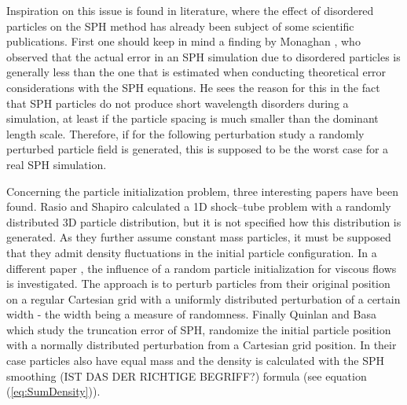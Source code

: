 \documentclass[11pt,a4paper,twoside]{report}
\begin{document}
 Inspiration on this issue is found in literature, where the effect of disordered particles on the SPH method has already been subject of some scientific publications.                                                                                                                      
 First one should keep in mind a finding by Monaghan \cite{Monaghan2005}, who observed that the actual error in an SPH simulation due to disordered particles is generally less than the one that is estimated when conducting theoretical error considerations with the SPH equations. He sees the reason for this in the fact that SPH particles do not produce short wavelength disorders during a simulation, at least if the particle spacing is much smaller than the dominant length scale. Therefore, if for the following perturbation study a randomly perturbed particle field is generated, this is supposed to be the worst case for a real SPH simulation.                                                                  
                                                                                                                                              
 Concerning the particle initialization problem, three interesting papers have been found. Rasio and Shapiro \cite{Rasio1991} calculated a 1D shock--tube problem with a randomly distributed 3D particle distribution, but it is not specified how this distribution is generated. As they further assume constant mass particles, it must be supposed that they admit density fluctuations in the initial particle configuration.          
 In a different paper \cite{Graham2007}, the influence of a random particle initialization for viscous flows is investigated. The approach is to perturb particles from their original position on a regular Cartesian grid with a uniformly distributed perturbation of a certain width - the width being a measure of randomness.                                                                                                         
 Finally Quinlan and Basa \cite{Quinlan2006} which study the truncation error of SPH, randomize the initial particle position with a normally distributed perturbation from a Cartesian grid position. In their case particles also have equal mass and the density is calculated with the SPH smoothing (IST DAS DER RICHTIGE BEGRIFF?) formula (see equation (\ref{eq:SumDensity})).                                                     
                                                                                                                                              
\end{document}
